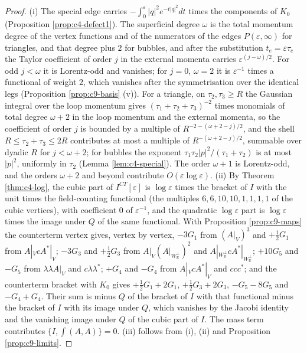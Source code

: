 \begin{proof}
(i) The special edge carries $-\int_0^\varepsilon|q|^2e^{-t|q|^2}dt$ times the components of $K_0$ (Proposition \ref{prop:c4-defect1}). The superficial degree $\omega$ is the total momentum degree of the vertex functions and of the numerators of the edges $P(\varepsilon,\infty)$ for triangles, and that degree plus $2$ for bubbles, and after the substitution $t_e=\varepsilon\tau_e$ the Taylor coefficient of order $j$ in the external momenta carries $\varepsilon^{(j-\omega)/2}$. For odd $j<\omega$ it is Lorentz-odd and vanishes; for $j=0$, $\omega=2$ it is $\varepsilon^{-1}$ times a functional of weight $2$, which vanishes after the symmetrisation over the identical legs (Proposition \ref{prop:c9-basis} (v)). For a triangle, on $\tau_2,\tau_3\ge R$ the Gaussian integral over the loop momentum gives $(\tau_1+\tau_2+\tau_3)^{-2}$ times monomials of total degree $\omega+2$ in the loop momentum and the external momenta, so the coefficient of order $j$ is bounded by a multiple of $R^{-2-(\omega+2-j)/2}$, and the shell $R\le\tau_2+\tau_3\le2R$ contributes at most a multiple of $R^{-(\omega+2-j)/2}$, summable over dyadic $R$ for $j<\omega+2$; for bubbles the exponent $\tau_1\tau_2|p|^2/(\tau_1+\tau_2)$ is at most $|p|^2$, uniformly in $\tau_2$ (Lemma \ref{lem:c4-special}). The order $\omega+1$ is Lorentz-odd, and the orders $\omega+2$ and beyond contribute $O(\varepsilon\log\varepsilon)$.
(ii) By Theorem \ref{thm:c4-log}, the cubic part of $I^{CT}[\varepsilon]$ is $\log\varepsilon$ times the bracket of $I$ with the unit times the field-counting functional (the multiples $6,6,10,10,1,1,1,1$ of the cubic vertices), with coefficient $0$ of $\varepsilon^{-1}$, and the quadratic $\log\varepsilon$ part is $\log\varepsilon$ times the image under $Q$ of the same functional. With Proposition \ref{prop:c9-maps} the counterterm vertex gives, vertex by vertex, $-3G_1$ from $(A|_V)^3$ and $+\tfrac12G_1$ from $A|_VcA^*|_V$; $-3G_3$ and $+\tfrac12G_3$ from $A|_V(A|_{W_{\mathbb R}^\perp})^2$ and $A|_{W_{\mathbb R}^\perp}cA^*|_{W_{\mathbb R}^\perp}$; $+10G_5$ and $-G_5$ from $\lambda\lambda A|_V$ and $c\lambda\lambda^*$; $+G_4$ and $-G_4$ from $A|_VcA^*|_V$ and $ccc^*$; and the counterterm bracket with $K_0$ gives $+\tfrac12G_1+2G_1$, $+\tfrac12G_3+2G_3$, $-G_5-8G_5$ and $-G_4+G_4$. Their sum is minus $Q$ of the bracket of $I$ with that functional minus the bracket of $I$ with its image under $Q$, which vanishes by the Jacobi identity and the vanishing image under $Q$ of the cubic part of $I$. The mass term contributes $\{I,\int(A,A)\}=0$. (iii) follows from (i), (ii) and Proposition \ref{prop:c9-limits}.
\end{proof}

